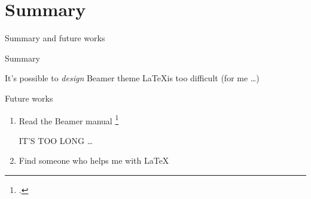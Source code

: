 \section{Summary}

\begin{frame}{Summary and future works}
  \begin{block}{Summary}
  \begin{enumerate}
    \okitem It's possible to \emph{design} Beamer theme
    \ngitem \LaTeX is too difficult (for me \dots)
  \end{enumerate}
  \end{block}
  
  \begin{block}{Future works}
  \begin{enumerate}
  \item
    Read the Beamer manual \footcite{beamerguide}
    \begin{itemize}
      \ngitem IT'S TOO LONG \dots
    \end{itemize}
  \item
    Find someone who helps me with \LaTeX{}
  \end{enumerate}
  \end{block}
  
\end{frame}
